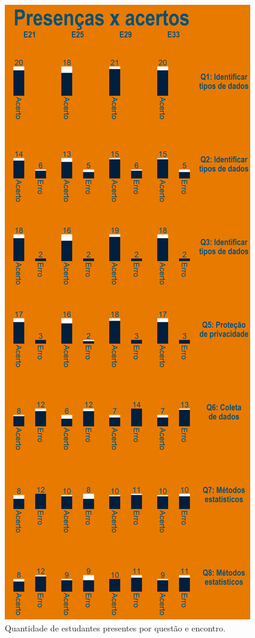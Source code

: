 \documentclass[
]{book}
\begin{document}
\begin{figure}

{\centering \includegraphics[width=0.75\linewidth,height=0.75\textheight]{images/Impactos/26} 

}

\caption{Quantidade de estudantes presentes por questão e encontro.}\label{fig:impacto26}
\end{figure}
\end{document}
